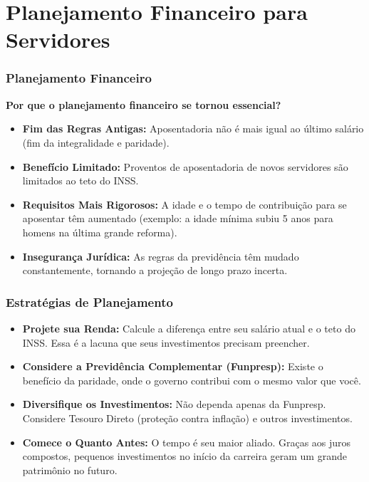 \section{Planejamento Financeiro para Servidores}

\begin{frame}[c]\frametitle{Planejamento Financeiro}
  \textbf{Por que o planejamento financeiro se tornou essencial?}
  \begin{itemize}
    \item \textbf{Fim das Regras Antigas:} Aposentadoria não é mais igual ao último salário (fim da integralidade e paridade).
    \item \textbf{Benefício Limitado:} Proventos de aposentadoria de novos servidores são limitados ao teto do INSS.
    \item \textbf{Requisitos Mais Rigorosos:} A idade e o tempo de contribuição para se aposentar têm aumentado (exemplo: a idade mínima subiu 5 anos para homens na última grande reforma).
    \item \textbf{Insegurança Jurídica:} As regras da previdência têm mudado constantemente, tornando a projeção de longo prazo incerta.
  \end{itemize}
\end{frame}

\begin{frame}[c]\frametitle{Estratégias de Planejamento}
  \begin{itemize}
    \item \textbf{Projete sua Renda:} Calcule a diferença entre seu salário atual e o teto do INSS. Essa é a lacuna que seus investimentos precisam preencher.
    \item \textbf{Considere a Previdência Complementar (Funpresp):} Existe o benefício da paridade, onde o governo contribui com o mesmo valor que você.
    \item \textbf{Diversifique os Investimentos:} Não dependa apenas da Funpresp. Considere Tesouro Direto (proteção contra inflação) e outros investimentos.
    \item \textbf{Comece o Quanto Antes:} O tempo é seu maior aliado. Graças aos juros compostos, pequenos investimentos no início da carreira geram um grande patrimônio no futuro.
  \end{itemize}
\end{frame}